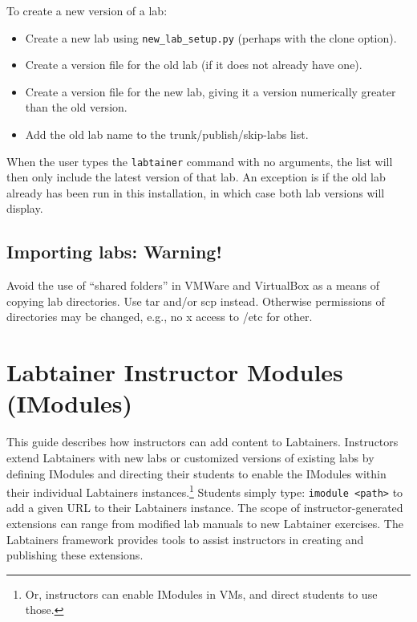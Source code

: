 \documentclass[12pt]{article}
\begin{document}
To create a new version of a lab:
\begin{itemize}
\item Create a new lab using {\tt new\_lab\_setup.py} (perhaps with the clone option).
\item Create a version file for the old lab (if it does not already have one). 
\item Create a version file for the new lab, giving it a version numerically greater than
the old version.
\item Add the old lab name to the trunk/publish/skip-labs list.
\end{itemize}

When the user types the {\tt labtainer} command with no arguments, the list will then
only include the latest version of that lab.  An exception is if the old lab already
has been run in this installation, in which case both lab versions will display.

\subsection{Importing labs: Warning!}
\label{warnings}
Avoid the use of ``shared folders'' in VMWare and VirtualBox as a means of copying lab
directories.  Use tar and/or scp instead.  Otherwise permissions of directories may
be changed, e.g., no x access to /etc for other.


\section {Labtainer Instructor Modules (IModules)}
\label{imodules}
This guide describes how instructors can add content to Labtainers.
Instructors extend Labtainers with new labs or customized versions of existing
labs by defining IModules and directing their students to enable the IModules within
their individual Labtainers instances.\footnote{Or, instructors can enable IModules in VMs, and direct students to use those.}
Students simply type: {\tt imodule <path>} to add a given URL to their Labtainers instance.
The scope of instructor-generated extensions can range from modified lab manuals 
to new Labtainer exercises.  The Labtainers framework provides tools
to assist instructors in creating and publishing these extensions. 
\end{document}
